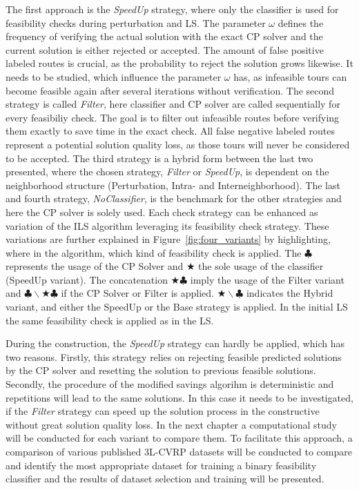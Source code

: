 The first approach is the \textit{SpeedUp} strategy, where only the classifier is used for feasibility checks during perturbation and
\gls{LS}. The parameter $\omega$ defines the frequency of verifying the actual solution with the exact \gls{CP} solver and
the current solution is either rejected or accepted.
The amount of false positive labeled routes is crucial, as the probability to reject the solution grows likewise. It needs
to be studied, which influence the parameter $\omega$ has, as infeasible tours can become feasible
again after several iterations without verification.
The second strategy is called \textit{Filter}, here classifier and \gls{CP} solver are called sequentially for every
feasibiliy check. The goal is to filter out infeasible routes before verifying them exactly to save time in the exact check.
All false negative labeled routes represent a potential solution quality loss, as those tours will never be considered to be accepted.
The third strategy is a hybrid form between the last two presented, where the chosen strategy, \textit{Filter} or \textit{SpeedUp},
is dependent on the neighborhood structure (Perturbation, Intra- and Interneighborhood). The last and fourth strategy, \textit{NoClassifier}, is the benchmark
for the other strategies and here the \gls{CP} solver is solely used. Each check strategy can be enhanced as variation of the \gls{ILS}
algorithm leveraging its feasibility check strategy. These variations are further explained in Figure~\ref{fig:four_variants} by highlighting, where
in the algorithm, which kind of feasibility check is applied. The $\clubsuit$ represents the usage of the \gls{CP} Solver and
$\bigstar$ the sole usage of the classifier (SpeedUp variant). The concatenation $\bigstar\clubsuit$ imply the usage of the Filter
variant and \(\clubsuit \backslash \bigstar\clubsuit\) if the \gls{CP} Solver or Filter is applied. \(\bigstar\backslash\clubsuit\)
indicates the Hybrid variant, and either the SpeedUp or the Base strategy is applied. In the initial \gls{LS} the same
feasibility check is applied as in the \gls{LS}.


\FloatBarrier
During the construction, the \textit{SpeedUp} strategy can hardly be applied, which has two reasons. Firstly, this strategy relies
on rejecting feasible predicted solutions by the \gls{CP} solver and resetting the solution to previous feasible solutions.
Secondly, the procedure of the modified savings algorihm is deterministic and repetitions will lead to the same solutions. In this
case it needs to be investigated, if the \textit{Filter} strategy can speed up the solution process in the constructive without
great solution quality loss. In the next chapter a computational study will be conducted for each variant to compare them. To facilitate this approach,
a comparison of various published \gls{3L-CVRP} datasets will be conducted to compare and identify the most appropriate
dataset for training a binary feasibility classifier and the results of dataset selection and training will be presented.
